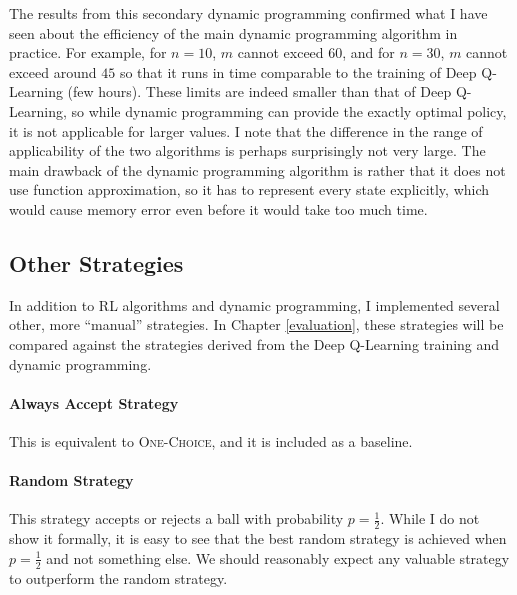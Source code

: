The results from this secondary dynamic programming confirmed what I have seen about the efficiency of the main dynamic programming algorithm in practice. For example, for $n=10$, $m$ cannot exceed $60$, and for $n=30$, $m$ cannot exceed around $45$ so that it runs in time comparable to the training of Deep Q-Learning (few hours). These limits are indeed smaller than that of Deep Q-Learning, so while dynamic programming can provide the exactly optimal policy, it is not applicable for larger values. I note that the difference in the range of applicability of the two algorithms is perhaps surprisingly not very large. The main drawback of the dynamic programming algorithm is rather that it does not use function approximation, so it has to represent every state explicitly, which would cause memory error even before it would take too much time. 


\subsection{Other Strategies}

In addition to RL algorithms and dynamic programming, I implemented several other, more ``manual'' strategies. In Chapter \ref{evaluation}, these strategies will be compared against the strategies derived from the Deep Q-Learning training and dynamic programming.


\paragraph{Always Accept Strategy}
This is equivalent to \textsc{One-Choice}, and it is included as a baseline.


\paragraph{Random Strategy}
This strategy accepts or rejects a ball with probability $p=\frac{1}{2}$. While I do not show it formally, it is easy to see that the best random strategy is achieved when $p=\frac{1}{2}$ and not something else.  We should reasonably expect any valuable strategy to outperform the random strategy.

